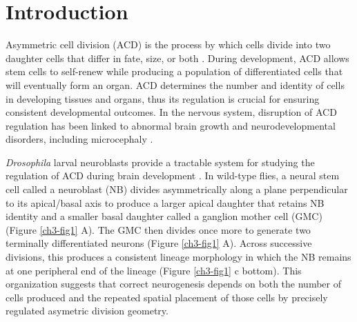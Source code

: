 \section{Introduction}

Asymmetric cell division (ACD) is the process by which cells divide into two daughter cells that differ in fate, size, or both \cite{horvitzMechanismsAsymmetricCell1992, sunchuPrinciplesMechanismsAsymmetric2020, knoblichAsymmetricCellDivision2010, venkei_2018_emergingmechanismsasymmetric, liArtChoreographingAsymmetric2013a}.
During development, ACD allows stem cells to self-renew while producing a population of differentiated cells that will eventually form an organ.
ACD determines the number and identity of cells in developing tissues and organs, thus its regulation is crucial for ensuring consistent developmental outcomes\cite{yang_2021_centrosomeregulationfunction, lechlerSpindlePositioningIts2021, bolkent_2024_cellularmolecularmechanisms}.
In the nervous system, disruption of ACD regulation has been linked to abnormal brain growth and neurodevelopmental disorders, including microcephaly \cite{yang_2021_centrosomeregulationfunction, siskos_2021_moleculargeneticsmicrocephaly, vaidProgenitorBasedCellBiological2022}.

\textit{Drosophila} larval neuroblasts provide a tractable system for studying the regulation of ACD during brain development \cite{gallaud_2017_drosophilamelanogasterneuroblastsa, sunchuPrinciplesMechanismsAsymmetric2020}.
In wild-type flies, a neural stem cell called a neuroblast (NB) divides asymmetrically along a plane perpendicular to its apical/basal axis to produce a larger apical daughter that retains NB identity and a smaller basal daughter called a ganglion mother cell (GMC) (Figure \ref{ch3-fig1} A)\cite{gallaud_2017_drosophilamelanogasterneuroblastsa, cabernard_2009_apicalbasalspindlea, homemDrosophilaNeuroblastsModel2012}.
The GMC then divides once more to generate two terminally differentiated neurons (Figure \ref{ch3-fig1} A)\cite{gallaud_2017_drosophilamelanogasterneuroblastsa, cabernard_2009_apicalbasalspindlea}.
Across successive divisions, this produces a consistent lineage morphology in which the NB remains at one peripheral end of the lineage (Figure \ref{ch3-fig1} c bottom).
This organization suggests that correct neurogenesis depends on both the number of cells produced and the repeated spatial placement of those cells by precisely regulated asymetric division geometry.

